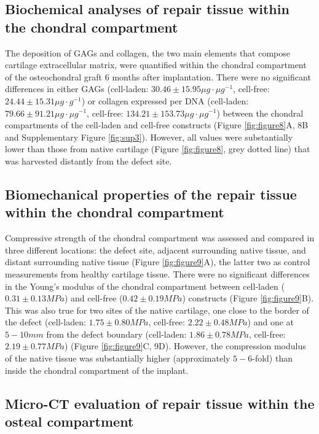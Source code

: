 \documentclass[twocolumn, empirical, authordate, issue]{jote-new-article}
\begin{document}
\subsection{Biochemical analyses of repair tissue within the chondral compartment} 

The deposition of GAGs and collagen, the two main elements that compose cartilage extracellular matrix, were quantified within the chondral compartment of the osteochondral graft 6 months after implantation. There were no significant differences in either GAGs (cell-laden: $30.46 \pm 15.95 \mu g\cdot\mu g^{-1}$, cell-free: $24.44 \pm 15.31 \mu g\cdot g^{-1}$) or collagen expressed per DNA (cell-laden: $79.66 \pm 91.21 \mu g\cdot\mu g^{-1}$, cell-free: $134.21\pm 153.73 \mu g\cdot\mu g^{-1}$) between the chondral compartments of the cell-laden and cell-free constructs (Figure \ref{fig:figure8}A, 8B and Supplementary Figure \ref{fig:sup3}). However, all values were substantially lower than those from native cartilage (Figure \ref{fig:figure8}, grey dotted line) that was harvested distantly from the defect site.


\subsection{Biomechanical properties of the repair tissue within the chondral compartment} 

Compressive strength of the chondral compartment was assessed and compared in three different locations: the defect site, adjacent surrounding native tissue, and distant surrounding native tissue (Figure \ref{fig:figure9}A), the latter two as control measurements from healthy cartilage tissue. There were no significant differences in the Young's modulus of the chondral compartment between cell-laden ($0.31 \pm 0.13 MPa$) and cell-free ($0.42 \pm 0.19 MPa$) constructs (Figure \ref{fig:figure9}B). This was also true for two sites of the native cartilage, one close to the border of the defect (cell-laden: $1.75 \pm 0.80 MPa$, cell-free: $2.22 \pm 0.48 MPa$) and one at $5 - 10 mm$ from the defect boundary (cell-laden: $1.86 \pm 0.78 MPa$, cell-free: $2.19 \pm 0.77 MPa$) (Figure \ref{fig:figure9}C, 9D). However, the compression modulus of the native tissue was substantially higher (approximately $5-6$-fold) than inside the chondral compartment of the implant.




\subsection{Micro-CT evaluation of repair tissue within the osteal compartment} 
\end{document}
